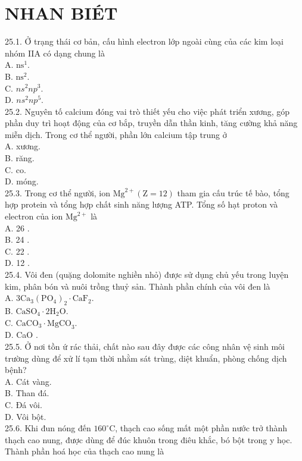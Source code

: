 \documentclass[10pt]{article}
\begin{document}
\section*{NHAN BIÉT}
25.1. Ở trạng thái cơ bản, cấu hình electron lớp ngoài cùng của các kim loại nhóm IIA có dạng chung là\\
A. $\mathrm{ns}{ }^{1}$.\\
B. $\mathrm{ns}^{2}$.\\
C. $n s^{2} n p^{3}$.\\
D. $n s^{2} n p^{5}$.\\
25.2. Nguyên tố calcium đóng vai trò thiết yếu cho việc phát triển xương, góp phần duy trì hoạt động của cơ bắp, truyền dẫn thần kinh, tăng cường khả năng miễn dịch. Trong cơ thể người, phần lớn calcium tập trung ở\\
A. xương.\\
B. răng.\\
C. co.\\
D. móng.\\
25.3. Trong cơ thể người, ion $\mathrm{Mg}^{2+}(\mathrm{Z}=12)$ tham gia cấu trúc tế bào, tổng hợp protein và tổng hợp chất sinh năng lượng ATP. Tổng số hạt proton và electron của ion $\mathrm{Mg}^{2+}$ là\\
A. 26 .\\
B. 24 .\\
C. 22 .\\
D. 12 .\\
25.4. Vôi đen (quặng dolomite nghiền nhỏ) được sử dụng chủ yếu trong luyện kim, phân bón và nuôi trồng thuỷ sản. Thành phần chính của vôi đen là\\
A. $3 \mathrm{Ca}_{3}\left(\mathrm{PO}_{4}\right)_{2} \cdot \mathrm{CaF}_{2}$.\\
B. $\mathrm{CaSO}_{4} \cdot 2 \mathrm{H}_{2} \mathrm{O}$.\\
C. $\mathrm{CaCO}_{3} \cdot \mathrm{MgCO}_{3}$.\\
D. CaO .\\
25.5. Ở nơi tồn ứ rác thải, chất nào sau đây được các công nhân vệ sinh môi trường dùng để xử lí tạm thời nhằm sát trùng, diệt khuẩn, phòng chống dịch bệnh?\\
A. Cát vàng.\\
B. Than đá.\\
C. Đá vôi.\\
D. Vôi bột.\\
25.6. Khi đun nóng đến $160^{\circ} \mathrm{C}$, thạch cao sống mất một phần nước trở thành thạch cao nung, được dùng để đúc khuôn trong điêu khắc, bó bột trong y học. Thành phần hoá học của thạch cao nung là\\
\end{document}
